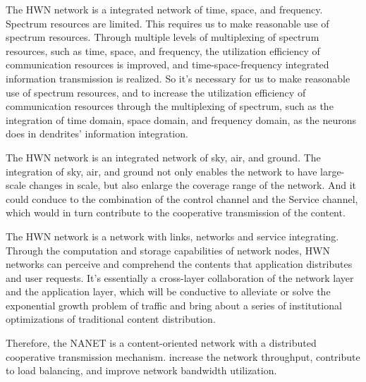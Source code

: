 \documentclass[journal,comsoc]{IEEEtran}
\begin{document}
				The HWN network is a integrated network of time, space, and frequency.
				Spectrum resources are limited. This requires us to make reasonable use of spectrum resources.
				Through multiple levels of multiplexing of spectrum resources, such as time, space, and frequency, the utilization efficiency of communication resources is improved, and time-space-frequency integrated information transmission is realized.
				So it's necessary for us to make reasonable use of spectrum resources, and to increase the utilization efficiency of communication resources through the multiplexing of spectrum, such as the integration of time domain, space domain, and frequency domain, as the neurons does in dendrites' information integration.
				
				The HWN network is an integrated network of sky, air, and ground. 
				The integration of sky, air, and ground not only enables the network to have large-scale changes in scale,
				but also enlarge the coverage range of the network.
				And it could conduce to the combination of the control channel and the Service channel, which would in turn contribute to the cooperative transmission of the content.
				
				The HWN network is a network with links, networks and service integrating.
				Through the computation and storage capabilities of network nodes, HWN networks can perceive and comprehend the contents that application distributes and user requests.
				It's essentially a cross-layer collaboration of the network layer and the application layer, 
				which will be conductive to alleviate or solve the exponential growth problem of traffic and bring about a series of  institutional optimizations of traditional content distribution.
				
				Therefore, the NANET is a content-oriented network with a distributed cooperative transmission mechanism. increase the network throughput, 
				contribute to load balancing, and improve network bandwidth utilization.
			
\end{document}
